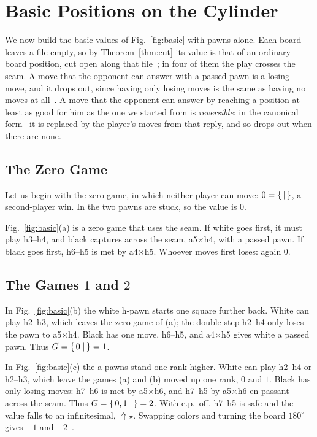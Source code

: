 \section{Basic Positions on the Cylinder}\label{sec:basic}

We now build the basic values of Fig.~\ref{fig:basic} with pawns alone. Each board leaves a file empty, so by
Theorem~\ref{thm:cut} its value is that of an ordinary-board position, cut open along that
file~\cite{Elkies1996,WuYuLandry2010}; in four of them the play crosses the seam. A move that the
opponent can answer with a passed pawn is a losing move, and it drops out, since having only losing moves is
the same as having no moves at all~\cite{WinningWays,WuYuLandry2010}. A move that the opponent can answer by reaching a
position at least as good for him as the one we started from is \emph{reversible}: in the canonical
form~\cite{WinningWays} it is replaced by the player's moves from that reply, and so drops out when there are
none.

\subsection{The Zero Game}
Let us begin with the zero game, in which neither player can move: $0=\{\, \mid \,\}$, a second-player win. In
 the two pawns are stuck, so the value is $0$.

Fig.~\ref{fig:basic}(a) is a zero game that uses the seam. If white goes first, it must play h3--h4, and black
captures across the seam, a5$\times$h4, with a passed pawn. If black goes first, h6--h5 is met by a4$\times$h5.
Whoever moves first loses: again $0$.

\subsection{The Games \texorpdfstring{$1$}{1} and \texorpdfstring{$2$}{2}}
In Fig.~\ref{fig:basic}(b) the white h-pawn starts one square further back. White can play h2--h3, which leaves
the zero game of (a); the double step h2--h4 only loses the pawn to a5$\times$h4. Black has one move, h6--h5,
and a4$\times$h5 gives white a passed pawn. Thus $G=\{\,0 \mid \,\}=1$.

In Fig.~\ref{fig:basic}(c) the a-pawns stand one rank higher. White can play h2--h4 or h2--h3, which leave the
games (a) and (b) moved up one rank, $0$ and $1$. Black has only losing moves: h7--h6 is met by
a5$\times$h6, and h7--h5 by a5$\times$h6 en passant across the seam. Thus $G=\{\,0,1 \mid \,\}=2$. With e.p.\
off, h7--h5 is safe and the value falls to an infinitesimal, ${\Uparrow}\star$. Swapping colors and turning the board $180^\circ$ gives $-1$ and
$-2$~\cite{WuYuLandry2010}.

